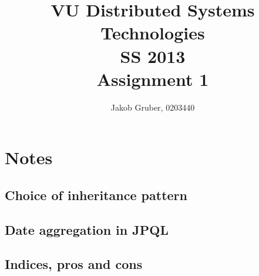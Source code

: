 \documentclass[a4paper,10pt]{article}
\title{VU Distributed Systems Technologies \\
       SS 2013 \\
       Assignment 1}
\author{Jakob Gruber, 0203440}
\begin{document}
\maketitle

\section{Notes}

\subsection{Choice of inheritance pattern}

\begin{comment}
InheritanceType: JOINED; Common table for base type, additional infos stored 
separately. SINGLE_TABLE sounds nice for our needs, but support is optional.

MappedSuperclass: the superclass contains persisted information, but is not
mapped as an entity by the JPA provider. State & mapping information common to
multiple entity classes. Non-entity superclasses don't support persistence,
and abstract entities are mapped (which we don't need).
\end{comment}

\subsection{Date aggregation in JPQL}

\begin{comment}
JPQL does not support date aggregation in any reasonable form, which means we
can't do summation within the query. Extract all rows individually, then
create the sum within java code.
\end{comment}

\subsection{Indices, pros and cons}

\begin{comment}
When is the User.password index helpful, when could it be harmful. Optional:
large-scale tests.
\end{comment}
\end{document}
